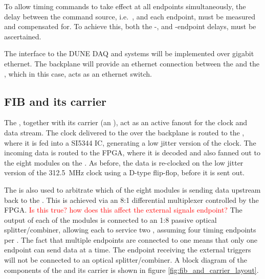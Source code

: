 \documentclass{article}
\begin{document}
To allow timing commands to take effect at all endpoints simultaneously, the delay between the command source, i.e.\ , and each endpoint, must be measured and compensated for. To achieve this, both the -, and -endpoint delays, must be ascertained.

The interface to the DUNE DAQ and  systems will be implemented over gigabit ethernet. The  backplane will provide an ethernet connection between the  and the , which in this case, acts as an
ethernet switch.

\subsection{FIB and its carrier}
The , together with its carrier (an ), act as an active fanout for the  clock and data stream. The clock delivered to the  over the  backplane is routed to the , where it is fed into a SI5344 IC, generating a low jitter version of the clock. The incoming data is routed to the  FPGA, where it is decoded and also fanned out to the eight  modules on the . As before, the  data is re-clocked on the low jitter version of the \SI{312.5}{\MHz} clock using a D-type flip-flop, before it is sent out.

The  is also used to arbitrate which of the eight  modules is sending data upstream back to the . This is achieved via an 8:1 differential multiplexer controlled by the  FPGA. \textcolor{red}{Is this true? how does this affect the external signals endpoint?} The output of each of the  modules is connected to an 1:8 passive optical splitter/combiner, allowing each  to service two , assuming four timing endpoints per . The fact that multiple endpoints are connected to one  means that only one endpoint can send  data at a time. The endpoint receiving the external triggers will not be connected to an optical splitter/combiner. A block diagram of the components of the  and its carrier is shown in figure \ref{fig:fib_and_carrier_layout}.
\end{document}
